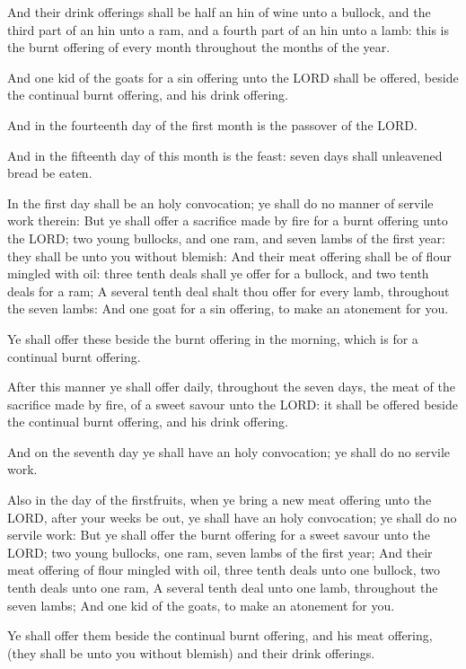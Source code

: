 \Verse And their drink offerings shall be half an hin of wine unto a
bullock, and the third part of an hin unto a ram, and a fourth part of
an hin unto a lamb: this is the burnt offering of every month
throughout the months of the year.

\Verse And one kid of the goats for a sin offering unto the LORD shall
be offered, beside the continual burnt offering, and his drink
offering.

\Verse And in the fourteenth day of the first month is the passover of
the LORD.

\Verse And in the fifteenth day of this month is the feast: seven days
shall unleavened bread be eaten.

\Verse In the first day shall be an holy convocation; ye shall do no
manner of servile work therein: \Verse But ye shall offer a sacrifice
made by fire for a burnt offering unto the LORD; two young bullocks,
and one ram, and seven lambs of the first year: they shall be unto you
without blemish: \Verse And their meat offering shall be of flour
mingled with oil: three tenth deals shall ye offer for a bullock, and
two tenth deals for a ram; \Verse A several tenth deal shalt thou offer
for every lamb, throughout the seven lambs: \Verse And one goat for a
sin offering, to make an atonement for you.

\Verse Ye shall offer these beside the burnt offering in the morning,
which is for a continual burnt offering.

\Verse After this manner ye shall offer daily, throughout the seven
days, the meat of the sacrifice made by fire, of a sweet savour unto
the LORD: it shall be offered beside the continual burnt offering, and
his drink offering.

\Verse And on the seventh day ye shall have an holy convocation; ye
shall do no servile work.

\Verse Also in the day of the firstfruits, when ye bring a new meat
offering unto the LORD, after your weeks be out, ye shall have an holy
convocation; ye shall do no servile work: \Verse But ye shall offer the
burnt offering for a sweet savour unto the LORD; two young bullocks,
one ram, seven lambs of the first year; \Verse And their meat offering
of flour mingled with oil, three tenth deals unto one bullock, two
tenth deals unto one ram, \Verse A several tenth deal unto one lamb,
throughout the seven lambs; \Verse And one kid of the goats, to make an
atonement for you.

\Verse Ye shall offer them beside the continual burnt offering, and his
meat offering, (they shall be unto you without blemish) and their
drink offerings.


